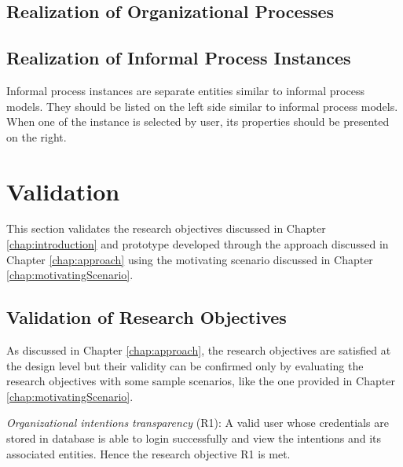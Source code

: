 	\subsection{Realization of Organizational Processes}
	
	
	\subsection{Realization of Informal Process Instances}
	Informal process instances are separate entities similar to informal process models. They should be listed on the left side similar to informal process models. When one of the instance is selected by user, its properties should be presented on the right.
	
	
\section{Validation}
\label{sec:validation}
This section validates the research objectives discussed in Chapter \ref{chap:introduction} and prototype developed through the approach discussed in Chapter \ref{chap:approach} using the motivating scenario discussed in Chapter \ref{chap:motivatingScenario}.
	
	
\subsection{Validation of Research Objectives}
\label{subsec:validationofrequirements}
As discussed in Chapter \ref{chap:approach}, the research objectives are satisfied at the design level but their validity can be confirmed only by evaluating the research objectives with some sample scenarios, like the one provided in Chapter \ref{chap:motivatingScenario}.   

\textit{Organizational intentions transparency} (R1): A valid user whose credentials are stored in database is able to login successfully and view the intentions and its associated entities. Hence the research objective R1 is met.

